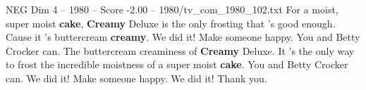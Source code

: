 \begin{textsample}{NEG Dim 4 – 1980 – Score -2.00 – 1980/tv\_com\_1980\_102.txt}  \label{ex:f4_neg_031}
For a moist, super moist \textbf{cake}, \textbf{Creamy} Deluxe is the only frosting that 's good enough.
Cause it 's buttercream \textbf{creamy}.
We did it!
Make someone happy.
You and Betty Crocker can.
The buttercream creaminess of \textbf{Creamy} Deluxe.
It 's the only way to frost the incredible moistness of a super moist \textbf{cake}.
You and Betty Crocker can.
We did it!
Make someone happy.
We did it!
Thank you.

\end{textsample}
